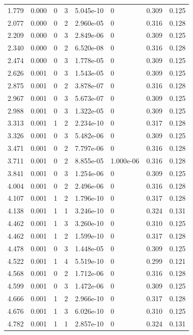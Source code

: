 \documentclass[preview]{standalone}
\begin{document}
{{\begin{tabular}{L{1.2cm}C{1.2cm} C{0.3cm}C{0.5cm} C{1.4cm}C{1.4cm} C{1.4cm}C{1.4cm}}
  1.779  &  0.000  & 0     &  3 &  5.045e-10  & 0  & 0.309 &  0.125   \\ 
  2.077  &  0.000  & 0     &  2 &  2.960e-05  & 0  & 0.316 &  0.128   \\ 
  2.209  &  0.000  & 0     &  3 &  2.849e-06  & 0  & 0.309 &  0.125   \\ 
  2.340  &  0.000  & 0     &  2 &  6.520e-08  & 0  & 0.316 &  0.128   \\ 
  2.474  &  0.000  & 0     &  3 &  1.778e-05  & 0  & 0.309 &  0.125   \\ 
  2.626  &  0.001  & 0     &  3 &  1.543e-05  & 0  & 0.309 &  0.125   \\ 
  2.875  &  0.001  & 0     &  2 &  3.878e-07  & 0  & 0.316 &  0.128   \\ 
  2.967  &  0.001  & 0     &  3 &  5.673e-07  & 0  & 0.309 &  0.125   \\ 
  2.988  &  0.001  & 0     &  3 &  1.322e-05  & 0  & 0.309 &  0.125   \\ 
  3.313  &  0.001  & 1     &  2 &  2.234e-10  & 0  & 0.317 &  0.128   \\ 
  3.326  &  0.001  & 0     &  3 &  5.482e-06  & 0  & 0.309 &  0.125   \\ 
  3.471  &  0.001  & 0     &  2 &  7.797e-06  & 0  & 0.316 &  0.128   \\ 
  3.711  &  0.001  & 0     &  2 &  8.855e-05  & 1.000e-06  & 0.316 &  0.128   \\ 
  3.841  &  0.001  & 0     &  3 &  1.254e-06  & 0  & 0.309 &  0.125   \\ 
  4.004  &  0.001  & 0     &  2 &  2.496e-06  & 0  & 0.316 &  0.128   \\ 
  4.107  &  0.001  & 1     &  2 &  1.796e-10  & 0  & 0.317 &  0.128   \\ 
  4.138  &  0.001  & 1     &  1 &  3.246e-10  & 0  & 0.324 &  0.131   \\ 
  4.462  &  0.001  & 1     &  3 &  3.260e-10  & 0  & 0.310 &  0.125   \\ 
  4.462  &  0.001  & 1     &  2 &  1.599e-10  & 0  & 0.317 &  0.128   \\ 
  4.478  &  0.001  & 0     &  3 &  1.448e-05  & 0  & 0.309 &  0.125   \\ 
  4.522  &  0.001  & 1     &  4 &  5.519e-10  & 0  & 0.299 &  0.121   \\ 
  4.568  &  0.001  & 0     &  2 &  1.712e-06  & 0  & 0.316 &  0.128   \\ 
  4.599  &  0.001  & 0     &  3 &  1.472e-06  & 0  & 0.309 &  0.125   \\ 
  4.666  &  0.001  & 1     &  2 &  2.966e-10  & 0  & 0.317 &  0.128   \\ 
  4.676  &  0.001  & 1     &  3 &  6.026e-10  & 0  & 0.310 &  0.125   \\ 
  4.782  &  0.001  & 1     &  1 &  2.857e-10  & 0  & 0.324 &  0.131   \\ 
\hline 
\end{tabular} 

}}
\end{document}
